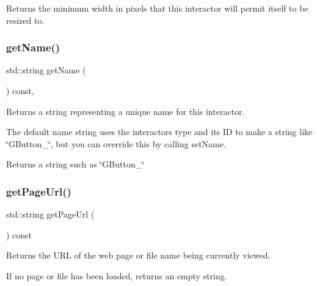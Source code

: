 Returns the minimum width in pixels that this interactor will permit itself to be resized to. 

\mbox{\label{classGInteractor_a8a60438a5b55d0b2ceb35c8674b9d8c5}} 
\subsubsection{\texorpdfstring{get\+Name()}{getName()}}
{\footnotesize\ttfamily std\+::string get\+Name (\begin{DoxyParamCaption}{ }\end{DoxyParamCaption}) const\hspace{0.3cm}{\ttfamily [virtual]}, {\ttfamily [inherited]}}



Returns a string representing a unique name for this interactor. 

The default name string uses the interactor\textquotesingle{}s type and its ID to make a string like \char`\"{}\+G\+Button\+\_\char`\"{}, but you can override this by calling set\+Name. \begin{DoxyReturn}{Returns}
a string such as \char`\"{}\+G\+Button\+\_\char`\"{} 
\end{DoxyReturn}
\mbox{\label{classGBrowserPane_aa7607fcbc7eef6590fae7a2d513268de}} 
\subsubsection{\texorpdfstring{get\+Page\+Url()}{getPageUrl()}}
{\footnotesize\ttfamily std\+::string get\+Page\+Url (\begin{DoxyParamCaption}{ }\end{DoxyParamCaption}) const\hspace{0.3cm}{\ttfamily [virtual]}}



Returns the U\+RL of the web page or file name being currently viewed. 

If no page or file has been loaded, returns an empty string. \mbox{\label{classGInteractor_a747de0961653847bdc6615dbf756d715}} 
